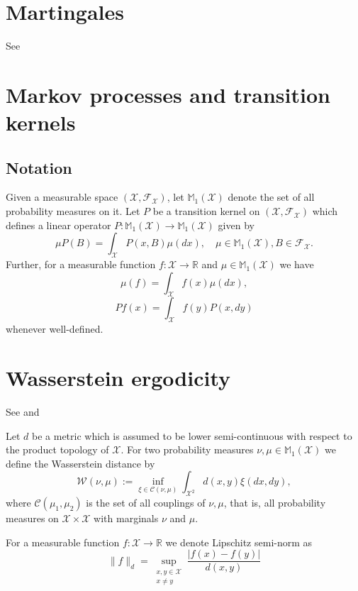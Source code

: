 
\section{Martingales}
See \cite{kallenberg2021foundations} 

\section{Markov processes and transition kernels}
\subsection*{Notation}

Given a measurable space $(\mathcal{X}, \mathcal{F}_{\mathcal{X}})$, let $\mathbb{M}_1(\mathcal{X})$ denote the set of all probability measures on it.
Let $P$ be a transition kernel on $(\mathcal{X}, \mathcal{F}_{\mathcal{X}})$ which defines a linear operator $P \colon \mathbb{M}_1(\mathcal{X}) \to \mathbb{M}_1(\mathcal{X})$ given by
\[
\mu P(B) = \int_{\mathcal{X}} P(x, B) \mu (dx) , \quad \mu \in \mathbb{M}_1(\mathcal{X}), B  \in  \mathcal{F}_{\mathcal{X}} .
\]
Further, for a measurable function $f \colon \mathcal{X} \to \mathbb{R}$ and $\mu \in \mathbb{M}_1(\mathcal{X})$ we have 
\[
\mu(f) = \int_{\mathcal{X}} f(x) \mu(dx),
\]
\[ 
Pf(x) = \int_{\mathcal{X}} f(y) P(x, dy) 
\]
whenever well-defined.

\section{Wasserstein ergodicity}

See \cite{douc2018markov} and \cite{rudolf2017perturbationtheorymarkovchains}

Let $d$ be a metric 
which is assumed to be lower semi-continuous with respect to the product topology of $\mathcal{X}$. For two probability measures $\nu, \mu \in \mathbb{M}_1(\mathcal{X})$ we define the Wasserstein distance by
\[
\mathcal{W}(\nu, \mu):=\inf_{\xi \in \mathcal{C}(\nu, \mu)} \int_{\mathcal{X}^2} d(x,y) \xi(dx , dy) ,
\]
where $\mathcal{C}(\mu_1, \mu_2)$ is the set of all couplings of $\nu, \mu$, that is, all probability measures on $\mathcal{X} \times \mathcal{X}$ with marginals $\nu$ and $\mu$.

For a measurable function $f \colon \mathcal{X} \to \mathbb{R}$ we denote Lipschitz semi-norm as
\[
\| f \|_d = \sup_{\substack{x, y \in \mathcal{X} \\ x \neq y}} \frac{\left\vert f(x) - f(y) \right\vert}{d(x, y)}
\]

